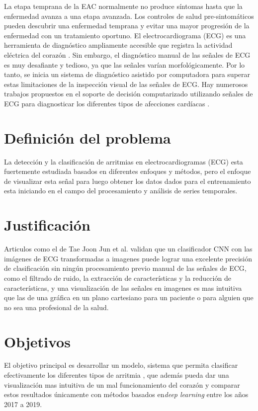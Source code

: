 La etapa temprana de la EAC normalmente no produce síntomas hasta que la enfermedad avanza a una etapa avanzada. Los controles de salud pre-sintomáticos pueden descubrir una enfermedad temprana y evitar una mayor progresión de la enfermedad con un tratamiento oportuno. El electrocardiograma (ECG) es una herramienta de diagnóstico ampliamente accesible que registra la actividad eléctrica del corazón \cite{diag}.
Sin embargo, el diagnóstico manual de las señales de ECG es muy desafiante y tedioso, ya que las señales varían morfológicamente.  Por lo tanto, se inicia un sistema de diagnóstico asistido por computadora para superar estas limitaciones de la inspección visual de las señales de ECG. Hay numerosos trabajos propuestos en el soporte de decisión computarizado utilizando señales de ECG para diagnosticar los diferentes tipos de afecciones cardíacas \cite{CAD}.

\section{Definición del problema}

La detección y la clasificación de arritmias en electrocardiogramas (ECG) esta fuertemente estudiada  basados en diferentes enfoques y métodos, pero el enfoque de visualizar esta señal para luego obtener los datos dados para el entrenamiento esta iniciando en el campo del procesamiento y análisis de series temporales.
\section{Justificación}

Articulos como el de Tae Joon Jun et al. \cite{jun2018ecg}  validan que un clasificador CNN  con las imágenes de ECG transformadas a imagenes puede lograr una excelente precisión de clasificación sin ningún procesamiento previo manual de las señales de ECG, como el filtrado de ruido, la extracción de características y la reducción de características, y una visualización de las señales en imagenes es mas intuitiva que las de una gráfica en un plano cartesiano para un paciente o para alguien que no sea una profesional de la salud.

\section{Objetivos}

El objetivo principal es desarrollar un modelo, sistema que permita clasificar efectivamente los diferentes tipos de arritmia , que además pueda dar una visualización mas intuitiva de un mal funcionamiento del corazón y comparar estos resultados únicamente con métodos basados en\textit{deep learning} entre los años 2017 a 2019. 

